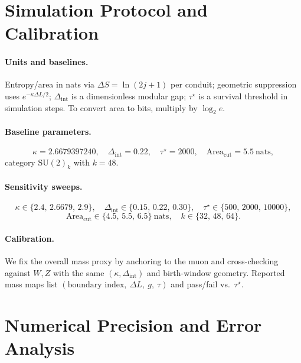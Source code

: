 \documentclass[11pt]{article}
\theoremstyle{plain}
\theoremstyle{definition}
\begin{document}
\section{Simulation Protocol and Calibration}\label{app:sim-protocol}

\paragraph{Units and baselines.}
Entropy/area in nats via $\Delta S=\ln(2j+1)$ per conduit; geometric suppression uses $e^{-\kappa \Delta L/2}$; $\Delta_{\mathrm{int}}$ is a dimensionless modular gap; $\tau^\star$ is a survival threshold in simulation steps. To convert area to bits, multiply by $\log_2 e$.

\paragraph{Baseline parameters.}
\[
  \kappa = 2.6679397240,\quad \Delta_{\mathrm{int}}=0.22,\quad \tau^\star=2000,\quad \mathrm{Area}_{\mathrm{cut}}=5.5\ \text{nats},
\]
category $\mathrm{SU}(2)_k$ with $k=48$.

\paragraph{Sensitivity sweeps.}
\[
  \kappa\in\{2.4,\,2.6679,\,2.9\},\quad
  \Delta_{\mathrm{int}}\in\{0.15,\,0.22,\,0.30\},\quad
  \tau^\star\in\{500,\,2000,\,10000\},
\]
\[
  \mathrm{Area}_{\mathrm{cut}}\in\{4.5,\,5.5,\,6.5\}\ \text{nats},\quad
  k\in\{32,\,48,\,64\}.
\]

\paragraph{Calibration.}
We fix the overall mass proxy by anchoring to the muon and cross-checking against $W,Z$ with the same $(\kappa,\Delta_{\mathrm{int}})$ and birth-window geometry. Reported mass maps list $(\text{boundary index},\ \Delta L,\ g,\ \tau)$ and pass/fail vs.\ $\tau^\star$.

\section{Numerical Precision and Error Analysis}
\label{app:errors}
\end{document}
